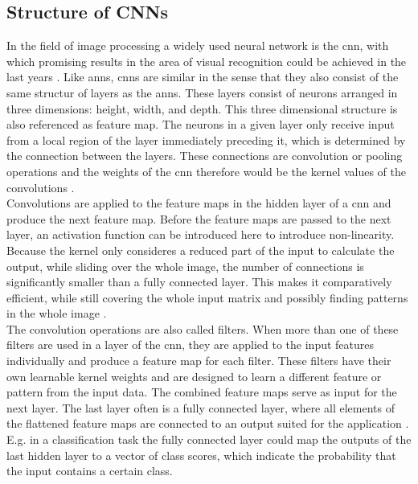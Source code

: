 \subsection{Structure of CNNs}
In the field of image processing a widely used neural network is the \acs{cnn}, with which promising results in the area of visual recognition could be achieved in the last years \cite{gu2018recent}.
Like \acsp{ann}, \acsp{cnn} are similar in the sense that they also consist of the same structur of layers as the \acsp{ann}.
These layers consist of neurons arranged in three dimensions: height, width, and depth.
This three dimensional structure is also referenced as feature map.
The neurons in a given layer only receive input from a local region of the layer immediately preceding it, which is determined by the connection between the layers. 
These connections are convolution or pooling operations and the weights of the \acs{cnn} therefore would be the kernel values of the convolutions \cite{journals/corr/OSheaN15}.\\
Convolutions are applied to the feature maps in the hidden layer of a \acs*{cnn} and produce the next feature map.
Before the feature maps are passed to the next layer, an activation function can be introduced here to introduce non-linearity.\\
Because the kernel only consideres a reduced part of the input to calculate the output, while sliding over the whole image, the number of connections is significantly smaller than a fully connected layer.
This makes it comparatively efficient, while still covering the whole input matrix and possibly finding patterns in the whole image \cite{Albawi2017}.\\
The convolution operations are also called filters.
When more than one of these filters are used in a layer of the \acs*{cnn}, they are applied to the input features individually and produce a feature map for each filter.
These filters have their own learnable kernel weights and are designed to learn a different feature or pattern from the input data.
The combined feature maps serve as input for the next layer. 
The last layer often is a fully connected layer, where all elements of the flattened feature maps are connected to an output suited for the application \cite{Ajit2020}.
E.g. in a classification task the fully connected layer could map the outputs of the last hidden layer to a vector of class scores, which indicate the probability that the input contains a certain class.

